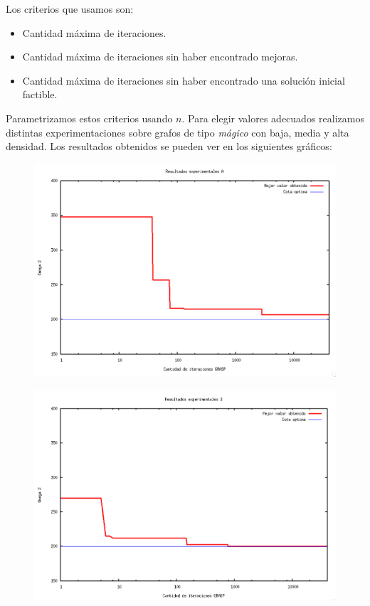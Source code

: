 Los criterios que usamos son:
\begin{itemize}
\item Cantidad máxima de iteraciones.
\item Cantidad máxima de iteraciones sin haber encontrado mejoras.
\item Cantidad máxima de iteraciones sin haber encontrado una solución inicial factible.
\end{itemize}

Parametrizamos estos criterios usando $n$. Para elegir valores adecuados realizamos distintas experimentaciones sobre grafos de tipo \textit{mágico} con baja, media y alta densidad. Los resultados obtenidos se pueden ver en los siguientes gráficos:

\begin{figure}[H]
\begin{center}
\includegraphics[angle=0, scale=.5]{imagenes/iteraciones-GRASP-A.png}
\label{Resultados experimentales A}
\end{center}
\end{figure}

\begin{figure}[H]
\begin{center}
\includegraphics[angle=0, scale=.5]{imagenes/iteraciones-GRASP-B.png}
\label{Resultados experimentales A}
\end{center}
\end{figure}

